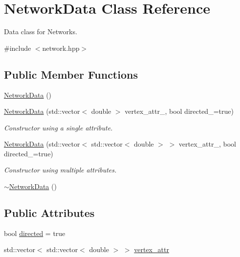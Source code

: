 \hypertarget{class_network_data}{}\section{Network\+Data Class Reference}
\label{class_network_data}


Data class for Networks.  




{\ttfamily \#include $<$network.\+hpp$>$}

\subsection*{Public Member Functions}
\begin{DoxyCompactItemize}
\item 
\hyperlink{class_network_data_af62a7dde71c52bc49bc1e0ddc27b4724}{Network\+Data} ()
\item 
\hyperlink{class_network_data_a431d2c3a6cf9f61437643b767821e4a5}{Network\+Data} (std\+::vector$<$ double $>$ vertex\+\_\+attr\+\_\+, bool directed\+\_\+=true)
\begin{DoxyCompactList}\small\item\em Constructor using a single attribute. \end{DoxyCompactList}\item 
\hyperlink{class_network_data_ac4b5a740d40bc84695653c3e3499ac65}{Network\+Data} (std\+::vector$<$ std\+::vector$<$ double $>$ $>$ vertex\+\_\+attr\+\_\+, bool directed\+\_\+=true)
\begin{DoxyCompactList}\small\item\em Constructor using multiple attributes. \end{DoxyCompactList}\item 
\hyperlink{class_network_data_a4667137d76017d3c69a789ad6cf86931}{$\sim$\+Network\+Data} ()
\end{DoxyCompactItemize}
\subsection*{Public Attributes}
\begin{DoxyCompactItemize}
\item 
bool \hyperlink{class_network_data_a5e67b89f22ad1151680a5f4428c6c780}{directed} = true
\item 
std\+::vector$<$ std\+::vector$<$ double $>$ $>$ \hyperlink{class_network_data_a3dc3e5549abc6daa85f30dbdc504ecac}{vertex\+\_\+attr}
\end{DoxyCompactItemize}


